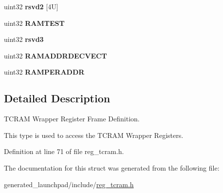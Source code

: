 \begin{DoxyCompactItemize}
\mbox{\label{structtcramBase_a8500907360faf10e7331f9f3f5d1c9c9}} 
uint32 {\bfseries rsvd2} \mbox{[}4\+U\mbox{]}
\item 
\mbox{\label{structtcramBase_ab73f9c064ce86faa98614a741828a9e2}} 
uint32 {\bfseries R\+A\+M\+T\+E\+ST}
\item 
\mbox{\label{structtcramBase_a65d85017ff4b449cc59a7d0e44f11a68}} 
uint32 {\bfseries rsvd3}
\item 
\mbox{\label{structtcramBase_a5186d6e25896cddd3a55667c909febba}} 
uint32 {\bfseries R\+A\+M\+A\+D\+D\+R\+D\+E\+C\+V\+E\+CT}
\item 
\mbox{\label{structtcramBase_aa8b6f1aa98fc84b55adb082852a9caa0}} 
uint32 {\bfseries R\+A\+M\+P\+E\+R\+A\+D\+DR}
\end{DoxyCompactItemize}


\subsection{Detailed Description}
T\+C\+R\+AM Wrapper Register Frame Definition. 

This type is used to access the T\+C\+R\+AM Wrapper Registers. 

Definition at line 71 of file reg\+\_\+tcram.\+h.



The documentation for this struct was generated from the following file\+:\begin{DoxyCompactItemize}
\item 
generated\+\_\+launchpad/include/\mbox{\hyperlink{reg__tcram_8h}{reg\+\_\+tcram.\+h}}\end{DoxyCompactItemize}
